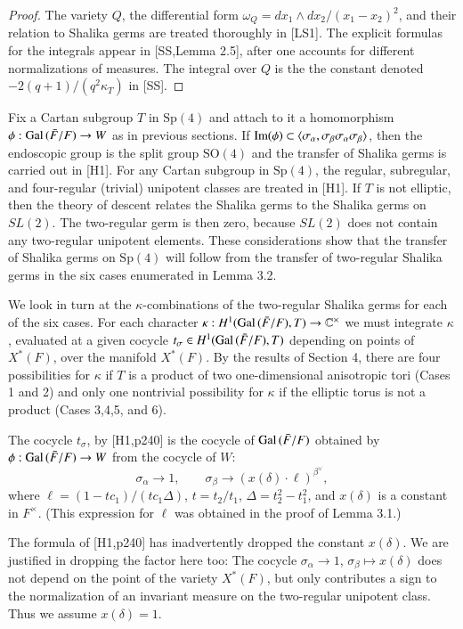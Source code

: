 \documentclass{amsart}
\newcommand\C{{\mathbb C}}
\newcommand\Gal{\hbox{Gal\,}}
\newcommand\Ima{\hbox{Im}}
\newcommand\bF{{\bar F}}
\begin{document}
\bigskip
\noindent
\begin{proof}   The variety $Q$, the differential form $\omega_Q=
dx_1\wedge dx_2/(x_1-x_2)^2$, and their relation to Shalika germs
are treated thoroughly in [LS1].  The explicit formulas for the integrals
appear in [SS,Lemma 2.5], after one accounts for different
normalizations of measures.  The
integral over $Q$ is the the constant denoted
$-2 (q+1)/(q^2 \kappa_T)$  in [SS].
\end{proof}
\bigskip

Fix a Cartan subgroup $T$ in $\text{Sp}(4)$ and attach to it a homomorphism
$\phi:\Gal(\bF/F)\to W$ as in previous sections.  If
$\Ima(\phi)\subset \langle\sigma_\alpha,\sigma_\beta\sigma_\alpha\sigma_\beta\rangle$, then the endoscopic group is the split group $\text{SO}(4)$ and
the transfer of Shalika germs is carried out in [H1].  For
any Cartan subgroup in $\text{Sp}(4)$, the regular, subregular, and
four-regular (trivial) unipotent classes are treated in [H1].
If $T$ is not elliptic, then the theory of descent relates
the Shalika germs to the Shalika germs on $SL(2)$. The
two-regular germ is then zero, because $SL(2)$ does not
contain any
two-regular unipotent elements.  These considerations show
that the transfer of Shalika germs on $\text{Sp}(4)$ will follow
from the transfer of two-regular Shalika germs in the
six cases enumerated in Lemma 3.2.

We look in turn at the $\kappa$-combinations of the two-regular
Shalika germs for each of the six cases.
For each character
$\kappa:H^1(\Gal(\bF/F),T)\to\C^\times$ we must integrate
$\kappa$, evaluated at
a given cocycle $t_\sigma\in H^1(\Gal(\bF/F),T)$ 
depending on points of $X^*(F)$,  over the manifold $X^*(F)$.
By the results of Section 4, there are four possibilities
for $\kappa$ if $T$ is a product of two one-dimensional
anisotropic tori
(Cases 1 and 2) and only one nontrivial possibility
for $\kappa$ if the elliptic torus is not a product (Cases 3,4,5,
and 6).

The cocycle $t_\sigma$, by [H1,p240] is the cocycle of $\Gal(\bF/F)$
obtained by $\phi:\Gal(\bF/F)\to W$ from the cocycle of $W$:
$$\sigma_\alpha\to 1,\qquad \sigma_\beta \to 
(x(\delta)\cdot \ell)^{\beta^\vee},$$
where $\ell = (1- t c_1)/(t c_1 \Delta)$, $t=t_2/t_1$, 
$\Delta=t_2^2-t_1^2$, and $x(\delta)$ is a constant in $F^\times$.
(This expression for $\ell$ was obtained in the proof of
Lemma 3.1.)  

The formula of [H1,p240] has inadvertently dropped the
constant $x(\delta)$.  We are justified in dropping the
factor here too:  The cocycle $\sigma_\alpha\to 1$, $\sigma_\beta\mapsto
x(\delta)$ does not depend on the point of the variety
$X^*(F)$, but only contributes a sign to the 
normalization of an invariant measure on the two-regular
unipotent class.   Thus we assume $x(\delta)=1$.
\end{document}
